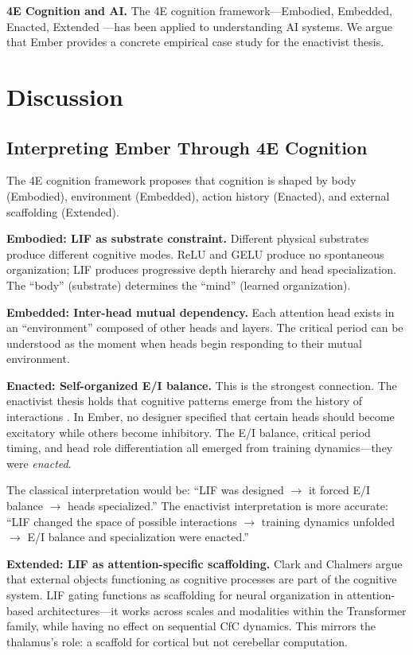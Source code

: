\documentclass[11pt]{article}
\begin{document}
\textbf{4E Cognition and AI.} The 4E cognition framework---Embodied, Embedded, Enacted, Extended \cite{gallagher2023embodied}---has been applied to understanding AI systems. We argue that Ember provides a concrete empirical case study for the enactivist thesis.


\section{Discussion}

\subsection{Interpreting Ember Through 4E Cognition}

The 4E cognition framework \cite{gallagher2023embodied,varela1991embodied} proposes that cognition is shaped by body (Embodied), environment (Embedded), action history (Enacted), and external scaffolding (Extended).

\textbf{Embodied: LIF as substrate constraint.} Different physical substrates produce different cognitive modes. ReLU and GELU produce no spontaneous organization; LIF produces progressive depth hierarchy and head specialization. The ``body'' (substrate) determines the ``mind'' (learned organization).

\textbf{Embedded: Inter-head mutual dependency.} Each attention head exists in an ``environment'' composed of other heads and layers. The critical period can be understood as the moment when heads begin responding to their mutual environment.

\textbf{Enacted: Self-organized E/I balance.} This is the strongest connection. The enactivist thesis holds that cognitive patterns emerge from the history of interactions \cite{varela1991embodied,dipaolo2014enactive}. In Ember, no designer specified that certain heads should become excitatory while others become inhibitory. The E/I balance, critical period timing, and head role differentiation all emerged from training dynamics---they were \emph{enacted}.

The classical interpretation would be: ``LIF was designed $\to$ it forced E/I balance $\to$ heads specialized.'' The enactivist interpretation is more accurate: ``LIF changed the space of possible interactions $\to$ training dynamics unfolded $\to$ E/I balance and specialization were enacted.''

\textbf{Extended: LIF as attention-specific scaffolding.} Clark and Chalmers \cite{clark1998extended} argue that external objects functioning as cognitive processes are part of the cognitive system. LIF gating functions as scaffolding for neural organization in attention-based architectures---it works across scales and modalities within the Transformer family, while having no effect on sequential CfC dynamics. This mirrors the thalamus's role: a scaffold for cortical but not cerebellar computation.
\end{document}
